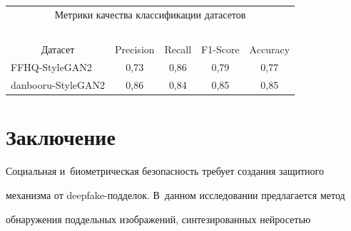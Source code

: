   


  \begin{table}\small


  \begin{center}


  \begin{tabular}{|l|c|c|c|c|}


  \multicolumn{5}{c}{Метрики качества классификации датасетов}\\


  \multicolumn{5}{c}{\ }\\[-6pt]


  \hline


\multicolumn{1}{|c|}{Датасет}&Precision&Recall&F1-Score&Accuracy\\


\hline


FFHQ-StyleGAN2&0,73&0,86&0,79&0,77\\


danbooru-StyleGAN2&0,86&0,84&0,85&0,85\\


\hline


\end{tabular}


\end{center}


\vspace*{-6pt}


\end{table}





\vspace*{-4pt}


    


\section{Заключение}





\vspace*{-2pt}





   Социальная и~биометрическая безопасность требует создания защитного 


механизма от deepfake-подделок. В~данном исследовании предлагается метод 


обнаружения поддельных изображений, синтезированных нейросетью 


